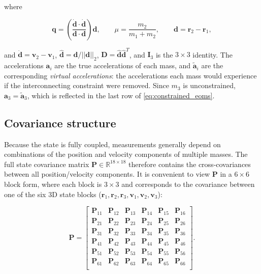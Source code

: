 \documentclass[]{article}
\newcommand{\norm}[1]{\left| \left| #1 \right| \right|_{2}}
\begin{document}
	where

	\begin{equation*}
		\mathbf{q} = \left( \frac{\dot{\mathbf{d}}\cdot \dot{\mathbf{d}}}{\mathbf{d} \cdot \mathbf{d}} \right) \mathbf{d}, \qquad \mu = \frac{m_2}{m_1 + m_2}, \qquad \mathbf{d} = \mathbf{r}_2 - \mathbf{r}_1,
	\end{equation*}

	and $\dot{\mathbf{d}} = \mathbf{v}_2 - \mathbf{v}_1$, $\hat{\mathbf{d}} = \mathbf{d} / \norm{\mathbf{d}}$, $\mathbf{D} = \hat{\mathbf{d}}\hat{\mathbf{d}}^T$, and $\mathbf{I}_3$ is the $3\times 3$ identity. The accelerations $\mathbf{a}_i$ are the true accelerations of each mass, and $\tilde{\mathbf{a}}_i$ are the corresponding \emph{virtual accelerations}: the accelerations each mass would experience if the interconnecting constraint were removed. Since $m_3$ is unconstrained, $\mathbf{a}_3=\tilde{\mathbf{a}}_3$, which is reflected in the last row of \eqref{eq:constrained_eoms}.

	\subsection{Covariance structure}

	Because the state is fully coupled, measurements generally depend on combinations of the position and velocity components of multiple masses.  The full state covariance matrix
	\(\mathbf{P}\in\mathbb{R}^{18\times18}\) therefore contains the cross-covariances between all position/velocity components.  It is convenient to view \(\mathbf{P}\) in a $6\times6$ block form, where each block is $3\times3$ and corresponds to the covariance between one of the six 3D state blocks (\(\mathbf{r}_1,\mathbf{r}_2,\mathbf{r}_3,\mathbf{v}_1,\mathbf{v}_2,\mathbf{v}_3\)):

	\begin{equation*}
	\mathbf{P} = \begin{bmatrix}
	\mathbf{P}_{11} & \mathbf{P}_{12} & \mathbf{P}_{13} & \mathbf{P}_{14} & \mathbf{P}_{15} & \mathbf{P}_{16} \\
	\mathbf{P}_{21} & \mathbf{P}_{22} & \mathbf{P}_{23} & \mathbf{P}_{24} & \mathbf{P}_{25} & \mathbf{P}_{26} \\
	\mathbf{P}_{31} & \mathbf{P}_{32} & \mathbf{P}_{33} & \mathbf{P}_{34} & \mathbf{P}_{35} & \mathbf{P}_{36} \\
	\mathbf{P}_{41} & \mathbf{P}_{42} & \mathbf{P}_{43} & \mathbf{P}_{44} & \mathbf{P}_{45} & \mathbf{P}_{46} \\
	\mathbf{P}_{51} & \mathbf{P}_{52} & \mathbf{P}_{53} & \mathbf{P}_{54} & \mathbf{P}_{55} & \mathbf{P}_{56} \\
	\mathbf{P}_{61} & \mathbf{P}_{62} & \mathbf{P}_{63} & \mathbf{P}_{64} & \mathbf{P}_{65} & \mathbf{P}_{66} \\
	\end{bmatrix}.
	\end{equation*}
\end{document}

